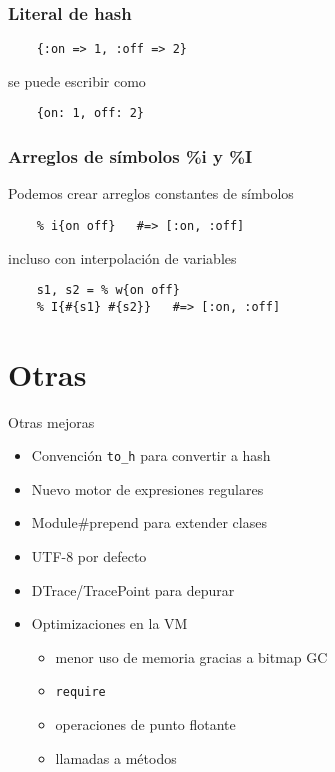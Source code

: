 \documentclass[compress]{beamer}
\begin{document}
\begin{frame}[fragile]
\frametitle{Literal de hash}
	\begin{lstlisting}
	{:on => 1, :off => 2}
	\end{lstlisting}
	
	se puede escribir como
	
	\begin{lstlisting}
	{on: 1, off: 2}
	\end{lstlisting}
\end{frame}


\begin{frame}[fragile]
\frametitle{Arreglos de símbolos \%i y \%I}
	Podemos crear arreglos constantes de símbolos
	\begin{lstlisting}
	% i{on off}   #=> [:on, :off]
	\end{lstlisting}
	
	incluso con interpolación de variables
	\begin{lstlisting}
	s1, s2 = % w{on off}
	% I{#{s1} #{s2}}   #=> [:on, :off]
	\end{lstlisting}
\end{frame}

\section{Otras}

\begin{frame}
	\begin{center}
	Otras mejoras
	\end{center}
\end{frame}

\begin{frame}
	\begin{itemize}
		\item Convención \texttt{to\_h} para convertir a hash
		\item Nuevo motor de expresiones regulares
		\item Module\#prepend para extender clases
		\item UTF-8 por defecto
		\item DTrace/TracePoint para depurar
		\item Optimizaciones en la VM
			\begin{itemize}
				\item menor uso de memoria gracias a bitmap GC
				\item \texttt{require}
				\item operaciones de punto flotante
				\item llamadas a métodos
			\end{itemize}
	\end{itemize}
\end{frame}
\end{document}
